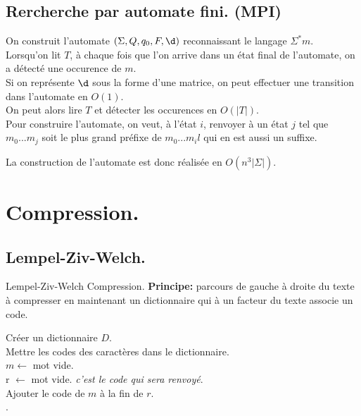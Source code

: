 \documentclass[french, 11pt]{article}
\begin{document}
\subsection{Rercherche par automate fini. (MPI)}

On construit l'automate $(\Sigma, Q, q_0, F, \d)$ reconnaissant le langage $\Sigma^* m$.\\
Lorsqu'on lit $T$, à chaque fois que l'on arrive dans un état final de l'automate, on a détecté une occurence de $m$.\\
Si on représente $\d$ sous la forme d'une matrice, on peut effectuer une transition dans l'automate en $O(1)$.\\
On peut alors lire $T$ et détecter les occurences en $O(|T|)$.\\
Pour construire l'automate, on veut, à l'état $i$, renvoyer à un état $j$ tel que $m_0...m_j$ soit le plus grand préfixe de $m_0...m_il$ qui en est aussi un suffixe. 
\begin{algorithm}
    \caption{Construction de l'automate.}
\end{algorithm}
La construction de l'automate est donc réalisée en $O(n^3|\Sigma|)$.

\section{Compression.}
\subsection{Lempel-Ziv-Welch.}
\begin{defi}{Lempel-Ziv-Welch Compression.}{}
    \textbf{Principe:} parcours de gauche à droite du texte à compresser en maintenant un dictionnaire qui à un facteur du texte associe un code.\n
    \begin{algorithm}[H]
        \caption{LZW-Compression}
        Créer un dictionnaire $D$.\\
        Mettre les codes des caractères dans le dictionnaire.\\
        $m \gets$ mot vide.\\
        r $\gets$ mot vide.  \emph{c'est le code qui sera renvoyé}.\\
        Ajouter le code de $m$ à la fin de $r$.\\
        .
    \end{algorithm}
\end{defi}
\end{document}
